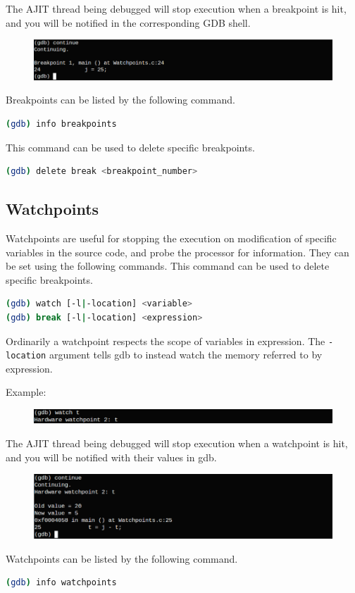 \documentclass[a4paper, 11pt]{article}
\begin{document}
The AJIT thread being debugged will stop execution when a breakpoint is hit, 
and you will be notified in the corresponding GDB shell.
\begin{figure}[H]
	\centering
	\includegraphics[width=0.8\columnwidth]{Figs/fifth.png}
\end{figure}
Breakpoints can be listed by the following command.
\begin{lstlisting}[language=bash]
(gdb) info breakpoints
\end{lstlisting}

This command can be used to delete specific breakpoints.
\begin{lstlisting}[language=bash]
(gdb) delete break <breakpoint_number>
\end{lstlisting}

\subsection{Watchpoints}
Watchpoints are useful for stopping the execution on modification of specific variables in the source code, and probe the processor for information. They can be set using the following commands.
This command can be used to delete specific breakpoints.
\begin{lstlisting}[language=bash]
(gdb) watch [-l|-location] <variable>
(gdb) break [-l|-location] <expression>
\end{lstlisting}
Ordinarily a watchpoint respects the scope of variables in expression. The \texttt{-location} argument tells gdb to instead watch the memory referred to by expression.

Example:
\begin{figure}[H]
	\centering
	\includegraphics[width=0.8\columnwidth]{Figs/sixth.png}
\end{figure}
The AJIT thread being debugged will stop execution when a watchpoint is hit, 
and you will be notified with their values in gdb.
\begin{figure}[H]
	\centering
	\includegraphics[width=0.8\columnwidth]{Figs/seventh.png}
\end{figure}
Watchpoints can be listed by the following command.
\begin{lstlisting}[language=bash]
(gdb) info watchpoints
\end{lstlisting}
\end{document}

